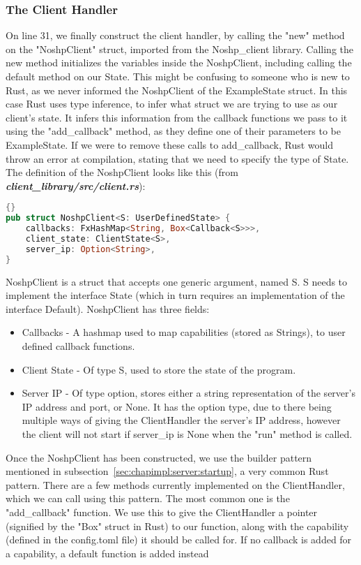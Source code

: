 \subsubsection{The Client Handler}
On line 31, we finally construct the client handler, by calling the "new" method on the "NoshpClient" struct, imported from the Noshp\_client library. Calling the new method initializes the variables inside the NoshpClient, including calling the default method on our State. This might be confusing to someone who is new to Rust, as we never informed the NoshpClient of the ExampleState struct. In this case Rust uses type inference, to infer what struct we are trying to use as our client's state. It infers this information from the callback functions we pass to it using the "add\_callback" method, as they define one of their parameters to be ExampleState. If we were to remove these calls to add\_callback, Rust would throw an error at compilation, stating that we need to specify the type of State. The definition of the NoshpClient  looks like this (from \textit{\textbf{client\_library/src/client.rs}}):
\begin{lstlisting}[language=Rust, style=boxed, showstringspaces=false]{}
pub struct NoshpClient<S: UserDefinedState> {
    callbacks: FxHashMap<String, Box<Callback<S>>>,
    client_state: ClientState<S>,
    server_ip: Option<String>,
}
\end{lstlisting}
NoshpClient is a struct that accepts one generic argument, named S. S needs to implement the interface State (which in turn requires an implementation of the interface Default). NoshpClient has three fields:
\begin{itemize}
    \item Callbacks - A hashmap used to map capabilities (stored as Strings), to user defined callback functions.
    \item Client State - Of type S, used to store the state of the program.
    \item Server IP - Of type option, stores either a string representation of the server's IP address and port, or None. It has the option type, due to there being multiple ways of giving the ClientHandler the server's IP address, however the client will not start if server\_ip is None when the "run" method is called.
\end{itemize}

Once the NoshpClient has been constructed, we use the builder pattern mentioned in subsection~\ref{sec:chapimpl:server:startup}, a very common Rust pattern. There are a few methods currently implemented on the ClientHandler, which we can call using this pattern. The most common one is the "add\_callback" function. We use this to give the ClientHandler a pointer (signified by the "Box" struct in Rust) to our function, along with the capability (defined in the config.toml file) it should be called for. If no callback is added for a capability, a default function is added instead

